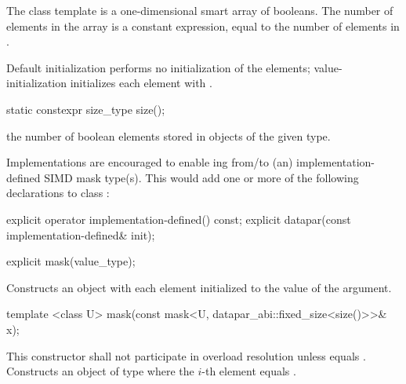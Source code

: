 

\pnum The class template \mask[<T, Abi>] is a one-dimensional smart array of booleans.
The number of elements in the array is a constant expression, equal to the number of elements in \datapar[<T, Abi>].



\pnum Default initialization performs no initialization of the elements; value-initialization initializes each element with .

\begin{itemdecl}
static constexpr size_type size();
\end{itemdecl}
\begin{itemdescr}
  \pnum\returns the number of boolean elements stored in objects of the given \mask[<T, Abi>] type.
\end{itemdescr}

\pnum\begin{noteEnv}Implementations are encouraged to enable ing from/to (an) implementation-defined SIMD mask type(s).
This would add one or more of the following declarations to class \mask:
\begin{itemdecl}
explicit operator implementation-defined() const;
explicit datapar(const implementation-defined& init);
\end{itemdecl}
\end{noteEnv}

\begin{itemdecl}
explicit mask(value_type);
\end{itemdecl}
\begin{itemdescr}
  \pnum\effects Constructs an object with each element initialized to the value of the argument.
\end{itemdescr}

\begin{itemdecl}
template <class U> mask(const mask<U, datapar_abi::fixed_size<size()>>& x);
\end{itemdecl}
\begin{itemdescr}
  \pnum\remarks This constructor shall not participate in overload resolution unless
     equals \fixedsizescoped{}.
  \pnum\effects Constructs an object of type \mask where the $i$-th element equals  \foralli.
\end{itemdescr}

